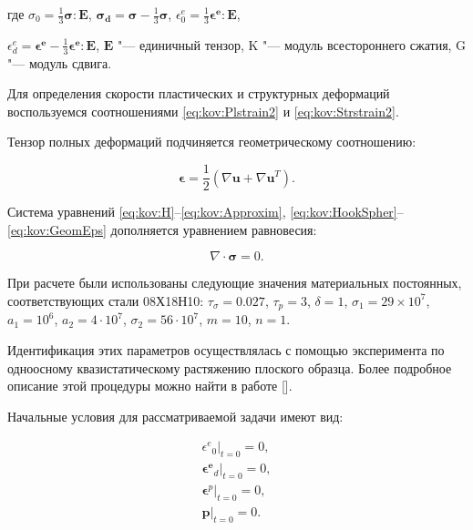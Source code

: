 где $\sigma_{0}=\frac{1}{3}\boldsymbol{\sigma}:\boldsymbol{E}$, $\boldsymbol{\sigma_{d}}=\boldsymbol{\sigma}-\frac{1}{3}\boldsymbol{\sigma}$, $\epsilon^{e}_{0}=\frac{1}{3}\boldsymbol{\epsilon^{e}}:\boldsymbol{E}$,

$\epsilon^{e}_{d}=\boldsymbol{\epsilon^{e}}-\frac{1}{3}\boldsymbol{\epsilon^{e}}:\boldsymbol{E}$, $\boldsymbol{E}$ "--- единичный тензор, K "--- модуль всестороннего сжатия, G "---  модуль сдвига.

Для определения скорости пластических и структурных деформаций воспользуемся соотношениями \eqref{eq:kov:Plstrain2} и \eqref{eq:kov:Strstrain2}.

Тензор полных деформаций подчиняется геометрическому соотношению:

\begin{equation}

\boldsymbol{\epsilon}=\frac{1}{2}(\nabla \boldsymbol{u}+\nabla \boldsymbol{u}^{T}). \label{eq:kov:GeomEps}

\end{equation}

Система уравнений \eqref{eq:kov:H}--\eqref{eq:kov:Approxim}, \eqref{eq:kov:HookSpher}--\eqref{eq:kov:GeomEps} дополняется уравнением равновесия:

$$

\nabla \cdot \boldsymbol{\sigma}=0.

$$

При расчете были использованы следующие значения материальных постоянных, соответствующих стали 08Х18Н10: $\tau_{\sigma}=0.027$, $\tau_{p}=3$, $\delta=1$, $\sigma_{1}=29\times 10^7$, $a_{1}=10^6$, $a_{2}=4\cdot10^7$, $\sigma_{2}=56\cdot10^7$, $m=10$, $n=1$.

Идентификация этих параметров осуществлялась  с помощью эксперимента по одноосному квазистатическому растяжению плоского образца. Более подробное описание этой процедуры можно найти в работе [].



Начальные условия для рассматриваемой задачи имеют вид:

\begin{gather*}

{\epsilon^{e}}_{0}\Big|_{t=0}=0,\\

\boldsymbol{{\epsilon}^{e}}_{d}\Big|_{t=0}=0,\\

\boldsymbol{\epsilon}^{p}\Big|_{t=0}=0,\\

\boldsymbol{p}\Big|_{t=0}=0.

\end{gather*}

